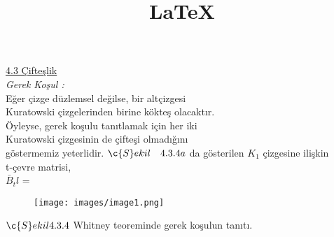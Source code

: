 \documentclass{article}
\title{\LaTeX}
\date{}
\begin{document}
\underline{4.3 \c{C}ifte\c{s}lik  \hspace{6cm}}\\
\textit{Gerek Ko\c{s}ul :}\\
E\u{g}er \c{c}izge d\"{u}zlemsel de\u{g}ilse, bir alt\c{c}izgesi\\
Kuratowski \c{c}izgelerinden birine k\"{o}kte\c{s} olacakt{\i}r.\\
\"{O}yleyse, gerek ko\c{s}ulu tan{\i}tlamak i\c{c}in her iki \\
Kuratowski \c{c}izgesinin de \c{c}ifte\c{s}i olmad{\i}\u{g}{\i}n{\i} \\
g\"{o}stermemiz yeterlidir.
$\c{S}ekil\quad 4.3.4a$ da gösterilen $K_1$ \c{c}izgesine ili\c{s}kin \\
t-\c{c}evre matrisi,\\
$\bar{B}_tl$ = \\

\begin{figure}[h]
\texttt{[image: images/image1.png]}
\end{figure}

$\c{S}ekil 4.3.4$ Whitney teoreminde gerek ko\c{s}ulun tan{\i}t{\i}.
\end{document}
